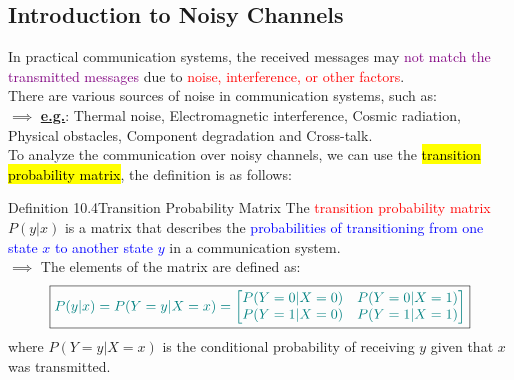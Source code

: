 \documentclass{book}
\begin{document}
\subsection{Introduction to Noisy Channels}
In practical communication systems, the received messages may \textcolor{purple}{not match the transmitted messages} due to \textcolor{red}{noise, interference, or other factors}.\\
\vspace{2mm}
There are various sources of noise in communication systems, such as:\\
$\implies$ \uline{\textbf{e.g.}}: Thermal noise, Electromagnetic interference, Cosmic radiation, Physical obstacles, Component degradation and Cross-talk.\\
\vspace{2mm}
To analyze the communication over noisy channels, we can use the \hl{transition probability matrix}, the definition is as follows:
\begin{defBox}{Definition 10.4}{Transition Probability Matrix}
    The \textcolor{red}{transition probability matrix} $P(y|x)$ is a matrix that describes the \textcolor{blue}{probabilities of transitioning from one state $x$ to another state $y$} in a communication system.\\
    $\implies$ The elements of the matrix are defined as:
    \[
        \boxed{\textcolor{teal}{P(y|x) = P(Y=y|X=x) = \begin{bmatrix} 
            P(Y=0|X=0) & P(Y=0|X=1) \\
            P(Y=1|X=0) & P(Y=1|X=1)
        \end{bmatrix}}}
    \]
    \hspace{8mm} where $P(Y=y|X=x)$ is the conditional probability of receiving $y$ given that $x$ was transmitted.
\end{defBox}
\end{document}
